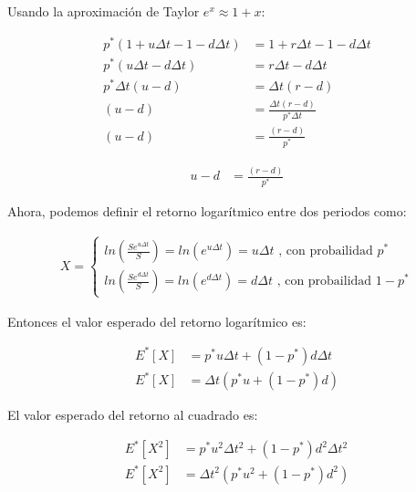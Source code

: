 \documentclass{article}
\theoremstyle{remark}
\theoremstyle{definition}
\begin{document}
    Usando la aproximaci\'on de Taylor $e^{x} \approx 1+x$:

    \begin{align*}
        p^{*} \left(1 + u \Delta t - 1 - d \Delta t \right) &= 1+r\Delta t - 1 - d\Delta t \\
        p^{*} \left(u \Delta t - d \Delta t \right) &= r\Delta t  - d\Delta t \\
        p^{*} \Delta t\left(u - d \right) &= \Delta t \left(r  - d \right) \\
        \left(u - d \right) &= \frac{\Delta t \left(r  - d\right)}{p^{*} \Delta t} \\
         \left(u - d \right) &= \frac{\left(r  - d\right)}{p^{*}} 
    \end{align*}


    \begin{align}
         u - d &= \frac{\left(r  - d\right)}{p^{*}}
    \end{align}

    Ahora, podemos definir el retorno logar\'itmico entre dos periodos como:

    \begin{align*}
       X= 
        \begin{cases}
            ln\left(\frac{Se^{u \Delta t}}{S}\right) = ln\left(e^{u\Delta t}\right) = u\Delta t \text{ , con probailidad } p^* \\
            ln\left(\frac{Se^{d \Delta t}}{S}\right) = ln\left(e^{d\Delta t}\right) = d\Delta t \text{ , con probailidad } 1-p^*
        \end{cases}
    \end{align*}

    Entonces el valor esperado del retorno logar\'itmico es:

    \begin{align*}
        E^{*}\left[X\right] &= p^{*}u\Delta t  + (1-p^{*})d\Delta t \\
        E^{*}\left[X\right] &= \Delta t \left(p^{*}u+(1-p^{*})d\right)
    \end{align*}

    El valor esperado del retorno al cuadrado es:

    \begin{align*}
        E^{*}\left[X^{2}\right] &= p^{*}u^{2}\Delta t^{2}  + (1-p^{*})d^{2}\Delta t^{2} \\
        E^{*}\left[X^{2}\right] &=  \Delta t^{2}\left(p^{*}u^{2}+(1-p^{*})d^{2}\right)
    \end{align*}
\end{document}
